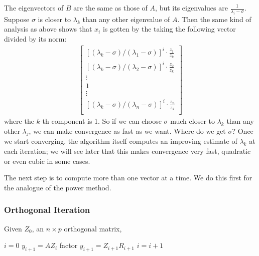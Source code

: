 \documentclass[11pt]{article}
\numberwithin{equation}{section}
\begin{document}
The eigenvectors of $B$ are the same as those of $A$, but its eigenvalues are $\frac{1}{\lambda_i - \sigma}$. 
Suppose $\sigma$ is closer to $\lambda_k$ than any other eigenvalue of $A$. 
Then the same kind of analysis as above shows that $x_i$ is gotten by the taking the following vector divided by its norm: \begin{align*}
    \left[\begin{array}{c}
        \left[\left(\lambda_{k}-\sigma\right) /\left(\lambda_{1}-\sigma\right)\right]^{i} \cdot \frac{z_{1}}{z_{k}} \\
        \left[\left(\lambda_{k}-\sigma\right) /\left(\lambda_{2}-\sigma\right)\right]^{i} \cdot \frac{z_{2}}{z_{k}} \\
        \vdots \\
        1 \\
        \vdots \\
        \left[\left(\lambda_{k}-\sigma\right) /\left(\lambda_{n}-\sigma\right)\right]^{i} \cdot \frac{z_{n}}{z_{k}} \\
        \end{array}\right]
\end{align*}
where the $k$-th component is 1. So if we can choose $\sigma$ much closer to $\lambda_k$ than any other $\lambda_j$, 
we can make convergence as fast as we want. Where do we get $\sigma$? Once we start converging, the algorithm itself computes an improving estimate of $\lambda_k$
at each iteration; we will see later that this makes convergence very fast, quadratic or even cubic in some cases.

The next step is to compute more than one vector at a time. We do this first for the analogue of the power method.

\subsubsection{Orthogonal Iteration}
Given $Z_0$, an $n \times p$ orthogonal matrix,
\begin{algorithmfrm}
    \begin{algorithmic}[1]
        \State $i = 0$
        \State $y_{i+1} = AZ_i$
        \State factor $y_{i+1} = Z_{i+1} R_{i+1} $
        \State $i = i + 1$
        \EndWhile
    \end{algorithmic}
\end{algorithmfrm}
\end{document}
